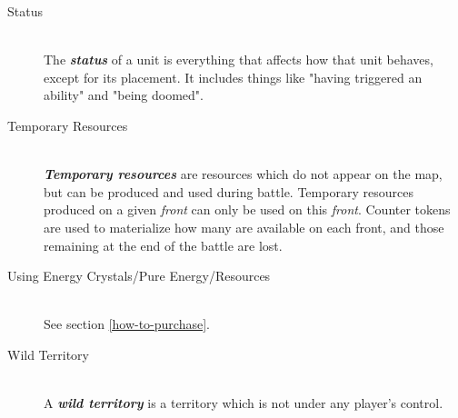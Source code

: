 \documentclass[a4paper]{article}
\begin{document}
\begin{description}
        \item[Status] \hfill \\
            The \textbf{\textit{status}} of a unit is everything that affects how
            that unit behaves, except for its placement.
            It includes things like "having triggered an ability" and "being doomed".
            
        \item[Temporary Resources] \hfill \\
            \textbf{\textit{Temporary resources}} are resources which do not appear
            on the map, but can be produced and used during battle.
            Temporary resources produced on a given \textit{front} can only be
            used on this \textit{front}.
            Counter tokens are used to materialize how many are available on each front,
            and those remaining at the end of the battle are lost.
            
        \item[Using Energy Crystals/Pure Energy/Resources] \hfill \\
            See section \ref{how-to-purchase}.
            
        \item[Wild Territory] \hfill \\
            A \textbf{\textit{wild territory}} is a territory
            which is not under any player's control.
    \end{description}
\end{document}

